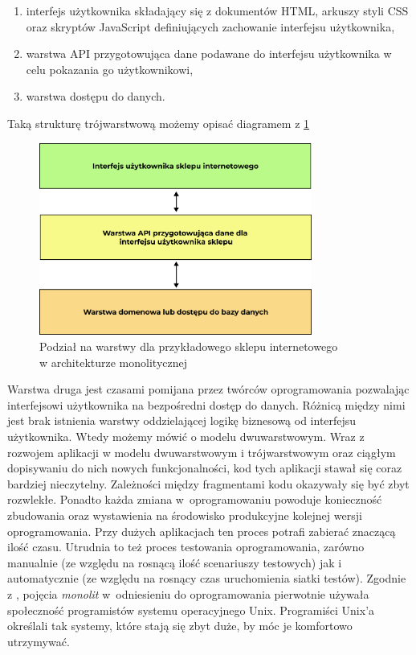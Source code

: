 \documentclass{SGGW-thesis}
\begin{document}
{\begin{enumerate}
	\item interfejs użytkownika składający się z dokumentów HTML, arkuszy styli CSS oraz skryptów JavaScript definiujących zachowanie interfejsu użytkownika,
	\item warstwa API przygotowująca dane podawane do interfejsu użytkownika w celu pokazania go użytkownikowi,
	\item warstwa dostępu do danych.
\end{enumerate}

Taką strukturę trójwarstwową możemy opisać diagramem z \cref{fig:monolith_diagram}

\begin{figure}[h]
	\centering
	\captionsetup{justification=centering}
	\includegraphics[width=0.8\textwidth]{monolith_diagram.png}
	\caption{Podział na warstwy dla przykładowego sklepu internetowego \\ w architekturze monolitycznej}
	\label{fig:monolith_diagram}
\end{figure}

Warstwa druga jest czasami pomijana przez twórców oprogramowania pozwalając interfejsowi użytkownika na bezpośredni dostęp do danych. Różnicą między nimi jest brak istnienia warstwy oddzielającej logikę biznesową od interfejsu użytkownika. Wtedy możemy mówić o modelu dwuwarstwowym.
Wraz z rozwojem aplikacji w modelu dwuwarstwowym i trójwarstwowym oraz ciągłym dopisywaniu do nich nowych funkcjonalności, kod tych aplikacji stawał się coraz bardziej nieczytelny. Zależności między fragmentami kodu okazywały się być zbyt rozwlekłe.
Ponadto każda zmiana w~oprogramowaniu powoduje konieczność zbudowania oraz wystawienia na środowisko produkcyjne kolejnej wersji oprogramowania. Przy dużych aplikacjach ten proces potrafi zabierać znaczącą ilość czasu. Utrudnia to też proces testowania oprogramowania, zarówno manualnie (ze względu na rosnącą ilość scenariuszy testowych) jak i automatycznie (ze względu na rosnący czas uruchomienia siatki testów).
Zgodnie z \cite{fowler}, pojęcia \textit{monolit} w~odniesieniu do oprogramowania pierwotnie używała społeczność programistów systemu operacyjnego Unix. Programiści Unix'a określali tak systemy, które stają się zbyt duże, by móc je komfortowo utrzymywać.

}
\end{document}
